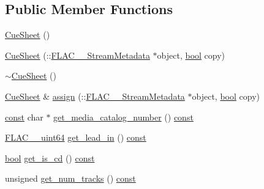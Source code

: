 \subsection*{Public Member Functions}
\begin{DoxyCompactItemize}
\item 
\hyperlink{class_f_l_a_c_1_1_metadata_1_1_cue_sheet_a46b6042e7c9081985c9be390c5c4d85c}{Cue\+Sheet} ()
\item 
\hyperlink{class_f_l_a_c_1_1_metadata_1_1_cue_sheet_add934e1916c2427197f8a5654f7ffae9}{Cue\+Sheet} (\+::\hyperlink{struct_f_l_a_c_____stream_metadata}{F\+L\+A\+C\+\_\+\+\_\+\+Stream\+Metadata} $\ast$object, \hyperlink{mac_2config_2i386_2lib-src_2libsoxr_2soxr-config_8h_abb452686968e48b67397da5f97445f5b}{bool} copy)
\item 
\hyperlink{class_f_l_a_c_1_1_metadata_1_1_cue_sheet_a879e743714c1f39b2b3e8665e4df8bf0}{$\sim$\+Cue\+Sheet} ()
\item 
\hyperlink{class_f_l_a_c_1_1_metadata_1_1_cue_sheet}{Cue\+Sheet} \& \hyperlink{class_f_l_a_c_1_1_metadata_1_1_cue_sheet_ac83a472ca9852f3e2e800ae57d3e1305}{assign} (\+::\hyperlink{struct_f_l_a_c_____stream_metadata}{F\+L\+A\+C\+\_\+\+\_\+\+Stream\+Metadata} $\ast$object, \hyperlink{mac_2config_2i386_2lib-src_2libsoxr_2soxr-config_8h_abb452686968e48b67397da5f97445f5b}{bool} copy)
\item 
\hyperlink{getopt1_8c_a2c212835823e3c54a8ab6d95c652660e}{const} char $\ast$ \hyperlink{class_f_l_a_c_1_1_metadata_1_1_cue_sheet_a13beaf12a9a5f96398ef86de24c82b0b}{get\+\_\+media\+\_\+catalog\+\_\+number} () \hyperlink{getopt1_8c_a2c212835823e3c54a8ab6d95c652660e}{const} 
\item 
\hyperlink{ordinals_8h_aa78c8c70a3eb8a58af7436f278acde8e}{F\+L\+A\+C\+\_\+\+\_\+uint64} \hyperlink{class_f_l_a_c_1_1_metadata_1_1_cue_sheet_ab83b46f22d92804c4f530567727644f1}{get\+\_\+lead\+\_\+in} () \hyperlink{getopt1_8c_a2c212835823e3c54a8ab6d95c652660e}{const} 
\item 
\hyperlink{mac_2config_2i386_2lib-src_2libsoxr_2soxr-config_8h_abb452686968e48b67397da5f97445f5b}{bool} \hyperlink{class_f_l_a_c_1_1_metadata_1_1_cue_sheet_aac4ff97e3ce045e6be608500e4e90b72}{get\+\_\+is\+\_\+cd} () \hyperlink{getopt1_8c_a2c212835823e3c54a8ab6d95c652660e}{const} 
\item 
unsigned \hyperlink{class_f_l_a_c_1_1_metadata_1_1_cue_sheet_a861fbea7c8fd6a8edc8f2a1e9a72b33d}{get\+\_\+num\+\_\+tracks} () \hyperlink{getopt1_8c_a2c212835823e3c54a8ab6d95c652660e}{const} 
\item 

\end{DoxyCompactItemize}
